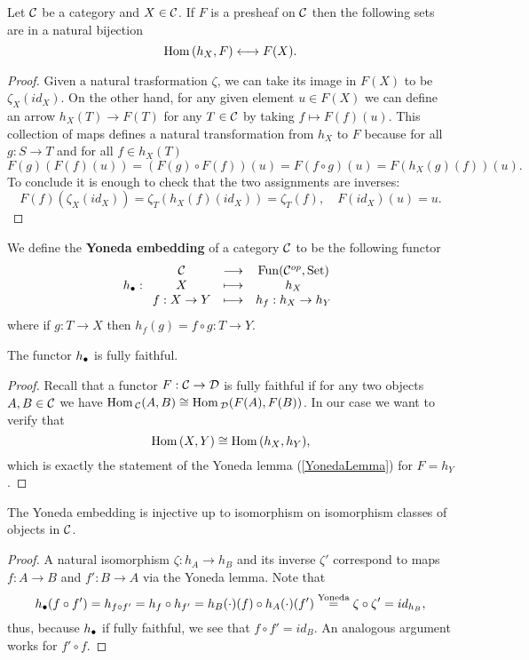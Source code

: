 \begin{lemma}\label{YonedaLemma}
Let $\mathcal{C}$ be a category and $X\in \mathcal{C}$. If $F$ is a presheaf on $\mathcal{C}$ then the following sets are in a natural bijection
\[\mathrm{Hom}\,(h_X,F)\longleftrightarrow F(X).\]
\end{lemma}
\begin{proof}
Given a natural trasformation $\zeta$, we can take its image in $F(X)$ to be $\zeta_X(id_X)$.
On the other hand, for any given element $u\in F(X)$ we can define an arrow $h_X(T)\to F(T)$ for any $T\in \mathcal{C}$ by taking $f\mapsto F(f)(u)$. This collection of maps defines a natural transformation from $h_X$ to $F$ because for all $g:S\to T$ and for all $f\in h_X(T)$
\[F(g)(F(f)(u))=(F(g)\circ F(f))(u)=F(f\circ g)(u)=F(h_X(g)(f))(u).\]
To conclude it is enough to check that the two assignments are inverses:
\[F(f)(\zeta_X(id_X))=\zeta_T(h_X(f)(id_X))=\zeta_T(f),\quad F(id_X)(u)=u.\]
\end{proof}

\begin{definition}
We define the \textbf{Yoneda embedding} of a category $\mathcal{C}$ to be the following functor
\[{h_\bullet}:\begin{array}{ccc} {\mathcal{C}} & \longrightarrow & {\mathrm{Fun}(\mathcal{C}^{op},\mathrm{Set})}\\ {X} & \longmapsto & {h_X}\\ {f:X\to Y} & \longmapsto & {h_f:h_X\to h_Y} \end{array}\]
where if $g:T\to X$ then $h_f(g)=f\circ g:T\to Y$.
\end{definition}


\begin{proposition}
The functor ${h_\bullet}$ is fully faithful.
\end{proposition}
\begin{proof}
Recall that a functor $F:\mathcal{C}\to \mathcal{D}$ is fully faithful if for any two objects $A,B\in\mathcal{C}$ we have $\mathrm{Hom}\,_{\mathcal{C}}(A,B)\cong \mathrm{Hom}\,_{\mathcal{D}}(F(A),F(B))$. In our case we want to verify that
\[\mathrm{Hom}\,(X,Y)\cong\mathrm{Hom}\,(h_X,h_Y),\]
which is exactly the statement of the Yoneda lemma (\ref{YonedaLemma}) for $F=h_Y$.
\end{proof}
\begin{proposition}\label{YonedaEmbeddingInjectiveOnIsoClasses}
The Yoneda embedding is injective up to isomorphism on isomorphism classes of objects in $\mathcal{C}$.
\end{proposition}
\begin{proof}
A natural isomorphism $\zeta:h_A\to h_B$ and its inverse $\zeta'$ correspond to maps $f:A\to B$ and $f':B\to A$ via the Yoneda lemma. Note that
\[{h_\bullet}(f\circ f')=h_{f\circ f'}=h_f\circ h_{f'}=h_B(\cdot)(f)\circ h_A(\cdot)(f')\overset{\text{Yoneda}}=\zeta\circ \zeta'=id_{h_B},\]
thus, because ${h_\bullet}$ if fully faithful, we see that $f\circ f'=id_B$. An analogous argument works for $f'\circ f$.
\end{proof}

